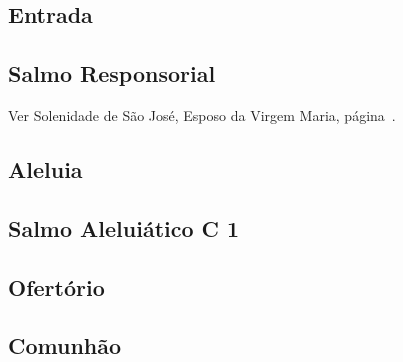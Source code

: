 
\subsection{Entrada}\label{subsection:communia/commune-dedicationis-ecclesiae/psalmi-ad-introitum}

\subsection{Salmo Responsorial}
\begin{rubrica}
  Ver Solenidade de São José, Esposo da Virgem Maria, página~\pageref{subsection:proprium-sanctorum/sancti-ioseph-sponsi-bmv/psalmus-responsorius}.
\end{rubrica}

\subsection{Aleluia}\label{subsection:communia/commune-dedicationis-ecclesiae/alleluia}

\AllowPageFlush

\subsection{Salmo Aleluiático \textmd{C 1}}\label{subsection:communia/commune-dedicationis-ecclesiae/psalmus-alleluiaticus}

\AllowPageFlush

\subsection{Ofertório}\label{subsection:communia/commune-dedicationis-ecclesiae/psalmi-ad-offertorium}

\AllowPageFlush

\subsection{Comunhão}\label{subsection:communia/commune-dedicationis-ecclesiae/psalmi-ad-communionem}
